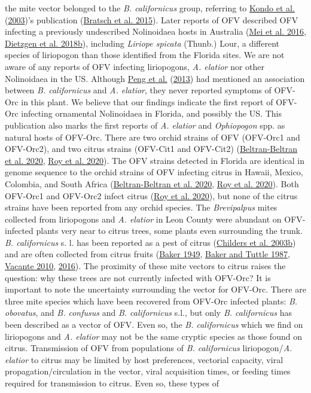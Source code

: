 \documentclass[12pt,final,CPage]{ufthesis}
\begin{document}
{the mite vector belonged to the \emph{B. californicus} group, referring to \protect\hyperlink{ref-Kondo2003}{Kondo et al.} (\protect\hyperlink{ref-Kondo2003}{2003})'s publication (\protect\hyperlink{ref-Bratsch2015}{Bratsch et al. 2015}). Later reports of OFV described OFV infecting a previously undescribed Nolinoidaea hosts in Australia (\protect\hyperlink{ref-Mei2016}{Mei et al. 2016}, \protect\hyperlink{ref-Dietzgen2018a}{Dietzgen et al. 2018b}), including \emph{Liriope spicata} (Thunb.) Lour, a different species of liriopogon than those identified from the Florida sites. We are not aware of any reports of OFV infecting liriopogons, \emph{A. elatior} nor other Nolinoidaea in the US. Although \protect\hyperlink{ref-Peng2013}{Peng et al.} (\protect\hyperlink{ref-Peng2013}{2013}) had mentioned an association between \emph{B. californicus} and \emph{A. elatior}, they never reported symptoms of OFV-Orc in this plant. We believe that our findings indicate the first report of OFV-Orc infecting ornamental Nolinoidaea in Florida, and possibly the US. This publication also marks the first reports of \emph{A. elatior} and \emph{Ophiopogon} spp. as natural hosts of OFV-Orc. There are two orchid strains of OFV (OFV-Orc1 and OFV-Orc2), and two citrus strains (OFV-Cit1 and OFV-Cit2) (\protect\hyperlink{ref-Beltran-Beltran2020}{Beltran-Beltran et al. 2020}, \protect\hyperlink{ref-Roy2020}{Roy et al. 2020}). The OFV strains detected in Florida are identical in genome sequence to the orchid strains of OFV infecting citrus in Hawaii, Mexico, Colombia, and South Africa (\protect\hyperlink{ref-Beltran-Beltran2020}{Beltran-Beltran et al. 2020}, \protect\hyperlink{ref-Roy2020}{Roy et al. 2020}). Both OFV-Orc1 and OFV-Orc2 infect citrus (\protect\hyperlink{ref-Roy2020}{Roy et al. 2020}), but none of the citrus strains have been reported from any orchid species. The \emph{Brevipalpus} mites collected from liriopogons and \emph{A. elatior} in Leon County were abundant on OFV-infected plants very near to citrus trees, some plants even surrounding the trunk. \emph{B. californicus} s. l. has been reported as a pest of citrus (\protect\hyperlink{ref-Childers2003}{Childers et al. 2003b}) and are often collected from citrus fruits (\protect\hyperlink{ref-Baker1949}{Baker 1949}, \protect\hyperlink{ref-Baker1987}{Baker and Tuttle 1987}, \protect\hyperlink{ref-Vacante2010}{Vacante 2010}, \protect\hyperlink{ref-Vacante2016}{2016}). The proximity of these mite vectors to citrus raises the question: why these trees are not currently infected with OFV-Orc? It is important to note the uncertainty surrounding the vector for OFV-Orc. There are three mite species which have been recovered from OFV-Orc infected plants: \emph{B. obovatus}, and \emph{B. confusus} and \emph{B. californicus} s.l., but only \emph{B. californicus} has been described as a vector of OFV. Even so, the \emph{B. californicus} which we find on liriopogons and \emph{A. elatior} may not be the same cryptic species as those found on citrus. Transmission of OFV from populations of \emph{B. californicus} liriopogon/\emph{A. elatior} to citrus may be limited by host preferences, vectorial capacity, viral propagation/circulation in the vector, viral acquisition times, or feeding times required for transmission to citrus. Even so, these types of }
\end{document}
